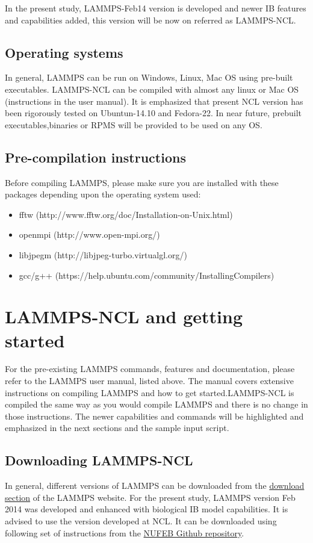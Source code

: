 \documentclass[11pt,a4paper,openright]{article}
\begin{document}
In the present study, LAMMPS-Feb14 version is developed and newer IB features and capabilities added, this version will be now on referred as LAMMPS-NCL. 

\subsection{Operating systems}
In general, LAMMPS can be run on Windows, Linux, Mac OS using pre-built executables. LAMMPS-NCL can be compiled with almost any linux or Mac OS (instructions in the user manual). It is emphasized that present NCL version has been rigorously tested on Ubuntun-14.10 and Fedora-22. In near future, prebuilt executables,binaries or RPMS will be provided to be used on any OS.

\subsection{Pre-compilation instructions}

Before compiling LAMMPS, please make sure you are installed with these packages depending upon the operating system used:

\begin{itemize}
\item fftw (http://www.fftw.org/doc/Installation-on-Unix.html)
\item openmpi (http://www.open-mpi.org/)
\item libjpegm (http://libjpeg-turbo.virtualgl.org/)
\item gcc/g++ (https://help.ubuntu.com/community/InstallingCompilers)
\end{itemize} 

\section{LAMMPS-NCL and getting started}
For the pre-existing LAMMPS commands, features and documentation, please refer to the LAMMPS user manual, listed above. The manual covers extensive instructions on compiling LAMMPS and how to get started.LAMMPS-NCL is compiled the same way as you would compile LAMMPS and there is no change in those instructions. The newer capabilities and commands will be highlighted and emphasized in the next sections and the sample input script. 


\subsection{Downloading LAMMPS-NCL}
In general, different versions of LAMMPS can be downloaded from the \href{http://lammps.sandia.gov/download.html}{download section} of the LAMMPS website. For the present study, LAMMPS version Feb 2014 was developed and enhanced with biological IB model capabilities. It is advised to use the version developed at NCL. It can be downloaded using following set of instructions from the \href{https://github.com/darrenjw/nufeb/tree/master/code/lammps1Feb2014}{NUFEB Github repository}.
 
\end{document}
